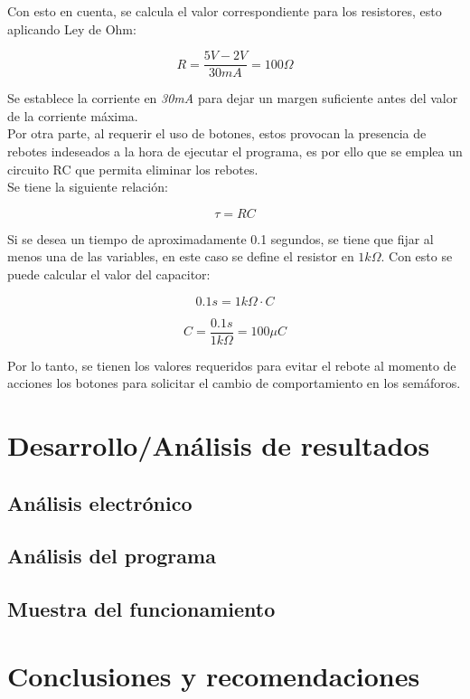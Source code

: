 \documentclass[12pt,letterpaper]{article}
\begin{document}
Con esto en cuenta, se calcula el valor correspondiente para los resistores, esto aplicando Ley de Ohm:

\begin{equation}
    R=\frac{5V-2V}{30mA} = 100\Omega
\end{equation}

Se establece la corriente en \textit{30mA} para dejar un margen suficiente antes del valor de la corriente máxima.\\ 

Por otra parte, al requerir el uso de botones, estos provocan la presencia de rebotes indeseados a la hora de ejecutar el programa, es por ello que se emplea un circuito RC que permita eliminar los rebotes\cite{Christoffersen_2015}.\\
Se tiene la siguiente relación:

\begin{equation}
    \tau = RC
\end{equation}

Si se desea un tiempo de aproximadamente 0.1 segundos, se tiene que fijar al menos una de las variables, en este caso se define el resistor en \textit{$1k\Omega$}. Con esto se puede calcular el valor del capacitor:

\[ 0.1s = 1k\Omega\cdot C\]

\begin{equation}
    C = \frac{0.1s}{1k\Omega} = 100\mu C
\end{equation}

Por lo tanto, se tienen los valores requeridos para evitar el rebote al momento de acciones los botones para solicitar el cambio de comportamiento en los semáforos.


\section{Desarrollo/Análisis de resultados}
\subsection{Análisis electrónico}


\subsection{Análisis del programa}



\subsection{Muestra del funcionamiento}


\newpage
\section{Conclusiones y recomendaciones}



\end{document}

